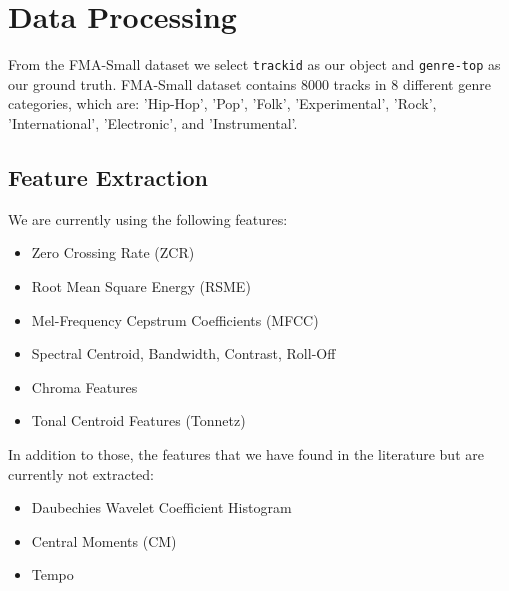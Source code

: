 \section{Data Processing}


From the FMA-Small dataset we select \texttt{trackid} as our object and \texttt{genre-top} as our ground truth. FMA-Small dataset contains 8000 tracks in 8 different genre categories, which are:
'Hip-Hop', 'Pop', 'Folk', 'Experimental', 'Rock', 'International', 'Electronic', and 'Instrumental'.




\subsection{Feature Extraction}

We are currently using the following features:

\begin{itemize}
    \item Zero Crossing Rate (ZCR) \cite{Li2006}
    \item Root Mean Square Energy (RSME) \cite{Tao}
    \item Mel-Frequency Cepstrum Coefficients (MFCC) \cite{Li2006, Nanni2016, Hoffmann2016, Lim2012}
    \item Spectral Centroid, Bandwidth, Contrast, Roll-Off \cite{Li2006, Li2005}
    \item Chroma Features
    \item Tonal Centroid Features (Tonnetz) \cite{Harte2006}
\end{itemize}

In addition to those, the features that we have found in the literature but are currently not extracted:

\begin{itemize}
    \item Daubechies Wavelet Coefficient Histogram \cite{Li2006}
    \item Central Moments (CM)
    \item Tempo
\end{itemize}
